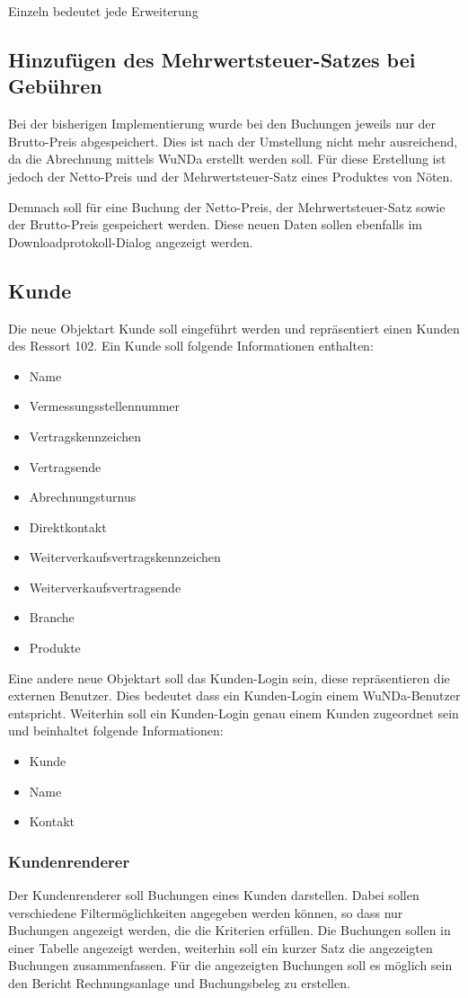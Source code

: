 Einzeln bedeutet jede Erweiterung
\subsection{Hinzufügen des Mehrwertsteuer-Satzes bei Gebühren}
Bei der bisherigen Implementierung wurde bei den Buchungen jeweils nur der Brutto-Preis abgespeichert. Dies ist nach der Umstellung nicht mehr ausreichend, da die Abrechnung mittels \ac{WuNDa} erstellt werden soll. Für diese Erstellung ist jedoch der Netto-Preis und der Mehrwertsteuer-Satz eines Produktes von Nöten.

Demnach soll für eine Buchung der Netto-Preis, der Mehrwertsteuer-Satz sowie der Brutto-Preis gespeichert werden. Diese neuen Daten sollen ebenfalls im Downloadprotokoll-Dialog angezeigt werden. 
\subsection{Kunde}
Die neue Objektart Kunde soll eingeführt werden und repräsentiert einen Kunden des Ressort 102.
Ein Kunde soll folgende Informationen enthalten: 
\begin{itemize}
\item Name
\item Vermessungsstellennummer
\item Vertragskennzeichen
\item Vertragsende
\item Abrechnungsturnus
\item Direktkontakt
\item Weiterverkaufsvertragskennzeichen
\item Weiterverkaufsvertragsende
\item Branche
\item Produkte
\end{itemize}
Eine andere neue Objektart soll das Kunden-Login sein, diese repräsentieren die externen Benutzer.
Dies bedeutet dass ein Kunden-Login einem \ac{WuNDa}-Benutzer entspricht.
Weiterhin soll ein Kunden-Login genau einem Kunden zugeordnet sein und beinhaltet folgende Informationen: 
\begin{itemize}
\item Kunde
\item Name
\item Kontakt
\end{itemize}
\subsubsection{Kundenrenderer}
Der Kundenrenderer soll Buchungen eines Kunden darstellen.
Dabei sollen verschiedene Filtermöglichkeiten angegeben werden können, so dass nur Buchungen angezeigt werden, die die Kriterien erfüllen.
Die Buchungen sollen in einer Tabelle angezeigt werden, weiterhin soll ein kurzer Satz die angezeigten Buchungen zusammenfassen.
Für die angezeigten Buchungen soll es möglich sein den Bericht Rechnungsanlage und Buchungsbeleg zu erstellen.

